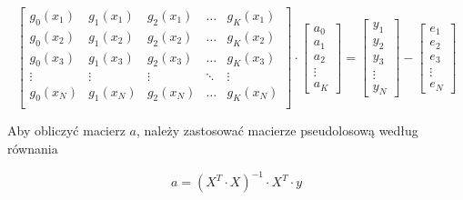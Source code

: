 \begin{equation*}
    \begin{bmatrix}
            g_0(x_1) & g_1(x_1) & g_2(x_1) & \hdots & g_K(x_1) \\
            g_0(x_2) & g_1(x_2) & g_2(x_2) & \hdots & g_K(x_2) \\
            g_0(x_3) & g_1(x_3) & g_2(x_3) & \hdots & g_K(x_3) \\
            \vdots & \vdots & \vdots & \ddots & \vdots \\ 
            g_0(x_N) & g_1(x_N) & g_2(x_N) & \hdots & g_K(x_N) \\
    \end{bmatrix}
\cdot \begin{bmatrix}
    a_0 \\ a_1 \\ a_2 \\ \vdots \\ a_K
\end{bmatrix}
 = \begin{bmatrix}
    y_1 \\ y_2 \\ y_3 \\ \vdots \\ y_N
\end{bmatrix} - \begin{bmatrix}
    e_1\\e_2\\e_3\\\vdots\\e_N
\end{bmatrix}
\end{equation*}

Aby obliczyć macierz $a$, należy zastosować macierze pseudolosową
według równania

\begin{equation*}
a = ( X^T \cdot X)^{-1} \cdot X^T \cdot y
\end{equation*}